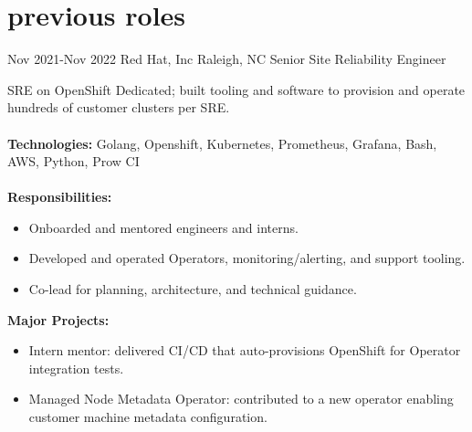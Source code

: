 
\section{previous roles}

\begin{entrylist}


\workentry
{Nov 2021-Nov 2022}
{Red Hat, Inc}
{Raleigh, NC}
{Senior Site Reliability Engineer}
{SRE on OpenShift Dedicated; built tooling and software to provision and operate hundreds of customer clusters per SRE. \\
\\
\textbf{Technologies:} Golang, Openshift, Kubernetes, Prometheus, Grafana, Bash, AWS, Python, Prow CI \\
\\
\textbf{Responsibilities:}
\begin{itemize}
\item Onboarded and mentored engineers and interns.
\item Developed and operated Operators, monitoring/alerting, and support tooling.
\item Co-lead for planning, architecture, and technical guidance.
\end{itemize}
\textbf{Major Projects:}
\begin{itemize}
\item Intern mentor: delivered CI/CD that auto-provisions OpenShift for Operator integration tests.
\item Managed Node Metadata Operator: contributed to a new operator enabling customer machine metadata configuration.
\end{itemize}
}



\end{entrylist}
